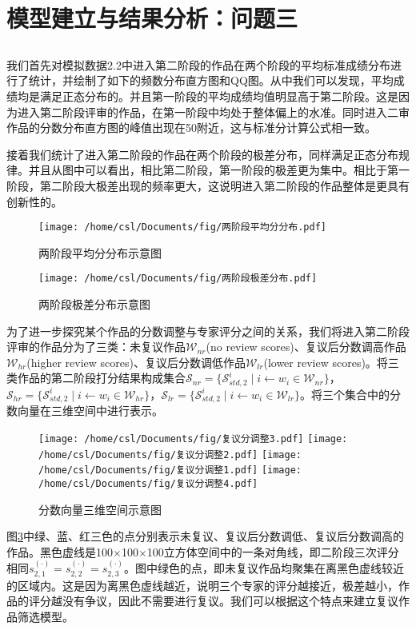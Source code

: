 \documentclass[bwprint]{gmcmthesis}
\begin{document}
\newpage
\section{模型建立与结果分析：问题三 }
\subsection{}
\par
	我们首先对模拟数据2.2中进入第二阶段的作品在两个阶段的平均标准成绩分布进行了统计，并绘制了如下的频数分布直方图和QQ图。从中我们可以发现，平均成绩均是满足正态分布的。并且第一阶段的平均成绩均值明显高于第二阶段。这是因为进入第二阶段评审的作品，在第一阶段中均处于整体偏上的水准。同时进入二审作品的分数分布直方图的峰值出现在50附近，这与标准分计算公式相一致。

接着我们统计了进入第二阶段的作品在两个阶段的极差分布，同样满足正态分布规律。并且从图中可以看出，相比第二阶段，第一阶段的极差更为集中。相比于第一阶段，第二阶段大极差出现的频率更大，这说明进入第二阶段的作品整体是更具有创新性的。
\begin{figure}[h]
	\centering
	\texttt{[image: /home/csl/Documents/fig/两阶段平均分分布.pdf]}
	\caption{\normf 两阶段平均分分布示意图}
	\label{fig:两阶段平均分分布示意图}
\end{figure}


\begin{figure}[h]
	\centering
	\texttt{[image: /home/csl/Documents/fig/两阶段极差分布.pdf]}
	\caption{\normf 两阶段极差分布示意图}
	\label{fig:两阶段极差分布示意图}
\end{figure}

为了进一步探究某个作品的分数调整与专家评分之间的关系，我们将进入第二阶段评审的作品分为了三类：未复议作品$\mathcal{W}_{nr}$(no review scores)、复议后分数调高作品$\mathcal{W}_{hr}$(higher review scores)、复议后分数调低作品$\mathcal{W}_{lr}$(lower review scores)。将三类作品的第二阶段打分结果构成集合$\mathcal{S}_{nr}=\{\mathcal{S}^i_{std,2}\;\vert\; i\gets w_i\in\mathcal{W}_{nr}\}$，$\mathcal{S}_{hr}=\{\mathcal{S}^i_{std,2}\;\vert\; i\gets w_i\in\mathcal{W}_{hr}\}$，$\mathcal{S}_{lr}=\{\mathcal{S}^i_{std,2}\;\vert\; i\gets w_i\in\mathcal{W}_{lr}\}$。将三个集合中的分数向量在三维空间中进行表示。

\begin{figure}[h]
	\centering
	\texttt{[image: /home/csl/Documents/fig/复议分调整3.pdf]}
	\texttt{[image: /home/csl/Documents/fig/复议分调整2.pdf]}
	\texttt{[image: /home/csl/Documents/fig/复议分调整1.pdf]}
	\texttt{[image: /home/csl/Documents/fig/复议分调整4.pdf]}
	\caption{\normf 分数向量三维空间示意图}
	\label{fig:分数向量三维空间示意图}
\end{figure}
图\ref{fig:分数向量三维空间示意图}中绿、蓝、红三色的点分别表示未复议、复议后分数调低、复议后分数调高的作品。黑色虚线是100$\times$100$\times$100立方体空间中的一条对角线，即二阶段三次评分相同$s^{(\cdot)}_{2,1}=s^{(\cdot)}_{2,2}=s^{(\cdot)}_{2,3}$。图中绿色的点，即未复议作品均聚集在离黑色虚线较近的区域内。这是因为离黑色虚线越近，说明三个专家的评分越接近，极差越小，作品的评分越没有争议，因此不需要进行复议。我们可以根据这个特点来建立复议作品筛选模型。
\end{document}
